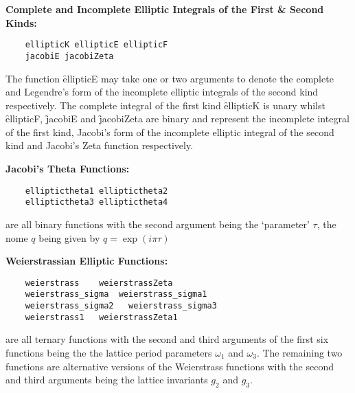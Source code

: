 \textbf{Complete and Incomplete Elliptic Integrals of the First \& Second Kinds:}
\begin{verbatim}
    ellipticK ellipticE ellipticF
    jacobiE jacobiZeta
\end{verbatim}
The function \f{ellipticE} may take one or two arguments to
denote the complete and Legendre's form of the incomplete elliptic integrals of
the second kind respectively. The complete integral of the first kind
\f{ellipticK} is unary whilst \f{ellipticF}, \f{jacobiE} and
\f{jacobiZeta} are binary and represent the incomplete integral of
the first kind, Jacobi's form of the incomplete elliptic integral of
the second kind and Jacobi's Zeta function respectively.

\textbf{Jacobi's Theta Functions:}
\begin{verbatim}
    elliptictheta1 elliptictheta2
    elliptictheta3 elliptictheta4
\end{verbatim}
are all binary functions with the second argument being the `parameter' $\tau$,
the nome $q$ being given by $q = \exp(i\pi\tau)$

\textbf{Weierstrassian Elliptic Functions:}
\begin{verbatim}
    weierstrass    weierstrassZeta
    weierstrass_sigma  weierstrass_sigma1
    weierstrass_sigma2   weierstrass_sigma3
    weierstrass1   weierstrassZeta1
\end{verbatim}
are all ternary functions with the second and third arguments of the first
six functions being the the lattice period parameters $\omega_1$ and $\omega_3$.
The remaining two functions are alternative versions of the Weierstrass
functions with the second and third arguments being the lattice invariants
$g_2$ and $g_3$.

